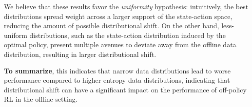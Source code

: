 We believe that these results favor the \textit{uniformity} hypothesis: intuitively, the best distributions spread weight across a larger support of the state-action space, reducing the amount of possible distributional shift. On the other hand, less-uniform distributions, such as the state-action distribution induced by the optimal policy, present multiple avenues to deviate away from the offline data distribution, resulting in larger distributional shift.

\textbf{To summarize}, this indicates that narrow data distributions lead to worse performance compared to higher-entropy data distributions, indicating that distributional shift can have a significant impact on the performance of off-policy RL in the offline setting.
